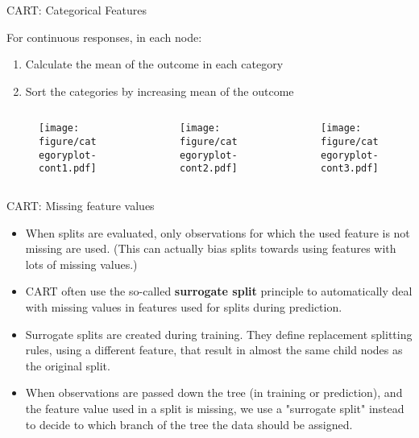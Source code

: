 \documentclass[11pt,compress,t,notes=noshow, xcolor=table]{beamer}
\begin{document}
\begin{vbframe}{CART: Categorical Features}

For continuous responses, in each node:
  \begin{enumerate}
  \item Calculate the mean of the outcome in each category
  \item Sort the categories by increasing mean of the outcome
  \end{enumerate}

  \begin{columns}
  \begin{column}{0.33\textwidth}
  \begin{figure}
  \texttt{[image: figure/categoryplot-cont1.pdf]} 
  \end{figure}
  \end{column}
  \begin{column}{0.33\textwidth}
  \begin{figure}
  \texttt{[image: figure/categoryplot-cont2.pdf]} 
  \end{figure}
  \end{column}
  \begin{column}{0.33\textwidth}
  \begin{figure}
  \texttt{[image: figure/categoryplot-cont3.pdf]} 
  \end{figure}
  \end{column}
  \end{columns}


\end{vbframe}

\begin{vbframe}{CART: Missing feature values}
  \begin{itemize}
    \item When splits are evaluated, only observations for which the used feature is not missing are used. (This can actually bias splits towards using features with lots of missing values.) 
  \item CART often use the so-called \textbf{surrogate split} principle to automatically deal with missing values in features used for splits during prediction.
  \item Surrogate splits are created during training. They define replacement splitting rules, using a different feature, that result in almost the same child nodes as the original split.
   \item When observations are passed down the tree (in training or prediction), and the feature value used in a split is missing, we use a "surrogate split" instead to decide to which branch of the tree the data should be assigned. 
  \end{itemize}
\end{vbframe}
\end{document}

